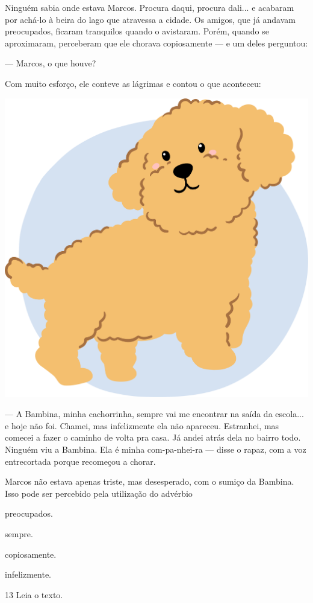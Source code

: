 \begin{myquote}
Ninguém sabia onde estava Marcos. Procura daqui, procura dali... e
acabaram por achá-lo à beira do lago que atravessa a cidade. Os amigos,
que já andavam preocupados, ficaram tranquilos quando o avistaram.
Porém, quando se aproximaram, perceberam que ele chorava copiosamente
--- e um deles perguntou:

--- Marcos, o que houve?

Com muito esforço, ele conteve as lágrimas e contou o que aconteceu:

\begin{center}
\includegraphics[width=.35\textwidth]{./media/image23v.png}
\end{center}

--- A Bambina, minha cachorrinha, sempre vai me encontrar na saída da
escola... e hoje não foi. Chamei, mas infelizmente ela não apareceu.
Estranhei, mas comecei a fazer o caminho de volta pra casa. Já andei
atrás dela no bairro todo. Ninguém viu a Bambina. Ela é minha
com-pa-nhei-ra --- disse o rapaz, com a voz entrecortada porque
recomeçou a chorar.

\end{myquote}

Marcos não estava apenas triste, mas desesperado, com o sumiço da
Bambina. Isso pode ser percebido pela utilização do advérbio

\begin{escolha}
\begin{multicols}{2}
\item preocupados.

\item sempre.

\item copiosamente.

\item infelizmente.
\end{multicols}
\end{escolha}

\num{13} Leia o texto.

